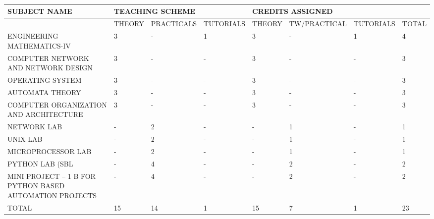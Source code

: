 \documentclass{article} %
\begin{document}
\begin{tabular}{|p{1.0in}|p{0.4in}|p{0.6in}|p{0.5in}|p{0.4in}|p{0.5in}|p{0.5in}|p{0.4in}|} \hline 
SUBJECT NAME & \multicolumn{3}{|p{1.5in}|}{TEACHING SCHEME} & \multicolumn{4}{|p{1.8in}|}{CREDITS ASSIGNED} \\ \hline 
 & THEORY & PRACTICALS & TUTORIALS & THEORY & TW/\newline PRACTICAL & TUTORIALS & TOTAL \\ \hline 
ENGINEERING MATHEMATICS-IV & 3 & - & 1 & 3 & - & 1 & 4 \\ \hline 
COMPUTER NETWORK AND NETWORK DESIGN & 3 & - & - & 3 & - & - & 3 \\ \hline 
OPERATING SYSTEM & 3 & - & - & 3 & - & - & 3 \\ \hline 
    AUTOMATA THEORY & 3 & - & - & 3 & - & - & 3 \\ \hline 
COMPUTER ORGANIZATION AND ARCHITECTURE & 3 & - & - & 3 & - & - & 3 \\ \hline 
NETWORK LAB & - & 2 & - & - & 1 & - & 1 \\ \hline 
UNIX LAB & - & 2 & - & - & 1 & - & 1 \\ \hline 
MICROPROCESSOR LAB & - & 2 & - & - & 1 & - & 1 \\ \hline 
PYTHON LAB (SBL & - & 4 & - & - & 2 & - & 2 \\ \hline 
MINI PROJECT -- 1 B FOR PYTHON BASED AUTOMATION PROJECTS & - & 4 & - & - & 2 & - & 2 \\ \hline 
TOTAL & 15 & 14 & 1 & 15 & 7 & 1 & 23 \\ \hline 
\end{tabular}



\noindent 

\noindent 

\noindent 

\noindent 

\noindent 

\noindent 

\noindent 

\noindent 

\noindent 

\noindent 

\noindent 

\noindent 

\noindent 

\noindent 

\textbf{}

\textbf{\underbar{}}
\end{document}
